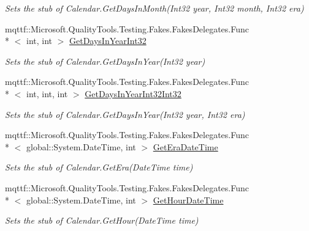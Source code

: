 \begin{DoxyCompactItemize}
\begin{DoxyCompactList}\small\item\em Sets the stub of Calendar.\-Get\-Days\-In\-Month(\-Int32 year, Int32 month, Int32 era)\end{DoxyCompactList}\item 
mqttf\-::\-Microsoft.\-Quality\-Tools.\-Testing.\-Fakes.\-Fakes\-Delegates.\-Func\\*
$<$ int, int $>$ \hyperlink{class_system_1_1_globalization_1_1_fakes_1_1_stub_calendar_af5867853a9adac853a27c94242ca072c}{Get\-Days\-In\-Year\-Int32}
\begin{DoxyCompactList}\small\item\em Sets the stub of Calendar.\-Get\-Days\-In\-Year(\-Int32 year)\end{DoxyCompactList}\item 
mqttf\-::\-Microsoft.\-Quality\-Tools.\-Testing.\-Fakes.\-Fakes\-Delegates.\-Func\\*
$<$ int, int, int $>$ \hyperlink{class_system_1_1_globalization_1_1_fakes_1_1_stub_calendar_a09aedb8672b60fe100036a95606b168c}{Get\-Days\-In\-Year\-Int32\-Int32}
\begin{DoxyCompactList}\small\item\em Sets the stub of Calendar.\-Get\-Days\-In\-Year(\-Int32 year, Int32 era)\end{DoxyCompactList}\item 
mqttf\-::\-Microsoft.\-Quality\-Tools.\-Testing.\-Fakes.\-Fakes\-Delegates.\-Func\\*
$<$ global\-::\-System.\-Date\-Time, int $>$ \hyperlink{class_system_1_1_globalization_1_1_fakes_1_1_stub_calendar_a5b036c8898865f9a1e831c2e9c6bb7f0}{Get\-Era\-Date\-Time}
\begin{DoxyCompactList}\small\item\em Sets the stub of Calendar.\-Get\-Era(\-Date\-Time time)\end{DoxyCompactList}\item 
mqttf\-::\-Microsoft.\-Quality\-Tools.\-Testing.\-Fakes.\-Fakes\-Delegates.\-Func\\*
$<$ global\-::\-System.\-Date\-Time, int $>$ \hyperlink{class_system_1_1_globalization_1_1_fakes_1_1_stub_calendar_ac09e93bd79236c706d482a0e7321f613}{Get\-Hour\-Date\-Time}
\begin{DoxyCompactList}\small\item\em Sets the stub of Calendar.\-Get\-Hour(\-Date\-Time time)\end{DoxyCompactList}\item 

\end{DoxyCompactItemize}
